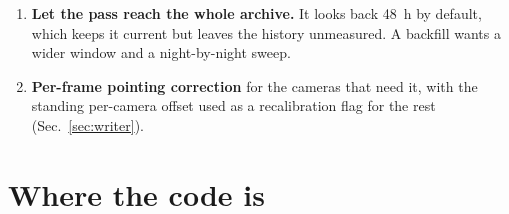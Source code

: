 \documentclass[11pt,a4paper]{article}
\begin{document}
\begin{enumerate}
    boundary takes the colour of the more faded of the two stars across it, so a
    clouded star is ringed in dark red all the way round. What remains is to
    assign each cell an optical depth rather than a relative brightness, feather
    the edges with the $\psi$-based smooth step at \SI{10}{\percent} of cell
    width, and publish the map as an image in the browse-history panel.
  \item \textbf{Let the pass reach the whole archive.} It looks back
    \SI{48}{\hour} by default, which keeps it current but leaves the history
    unmeasured. A backfill wants a wider window and a night-by-night sweep.
  \item \textbf{Per-frame pointing correction} for the cameras that need it,
    with the standing per-camera offset used as a recalibration flag for the
    rest (Sec.~\ref{sec:writer}).
\end{enumerate}

\section{Where the code is}
\end{document}
